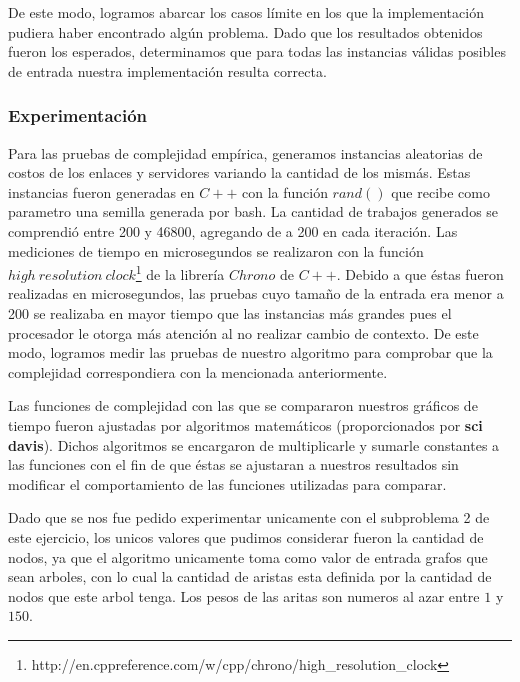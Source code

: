 De este modo, logramos abarcar los casos límite en los que la implementación pudiera haber encontrado algún problema. Dado que los resultados obtenidos fueron los esperados, determinamos que para todas las instancias válidas posibles de entrada nuestra implementación resulta correcta.

\subsubsection{Experimentación}

Para las pruebas de complejidad empírica, generamos instancias aleatorias de costos de los enlaces y servidores variando la cantidad de los mismás. Estas instancias fueron generadas en $C++$ con la función $rand()$ que recibe como parametro una semilla generada por bash. La cantidad de trabajos generados se comprendió entre 200 y 46800, agregando de a 200 en cada iteración. Las mediciones de tiempo en microsegundos se realizaron con la función $high\ resolution\ clock$\footnote{http://en.cppreference.com/w/cpp/chrono/high\_resolution\_clock} de la librería $Chrono$ de $C++$. Debido a que éstas fueron realizadas en microsegundos, las pruebas cuyo tamaño de la entrada era menor a 200 se realizaba en mayor tiempo que las instancias más grandes pues el procesador le otorga más atención al no realizar cambio de contexto. De este modo, logramos medir las pruebas de nuestro algoritmo para comprobar que la complejidad correspondiera con la mencionada anteriormente.

Las funciones de complejidad con las que se compararon nuestros gráficos de tiempo fueron ajustadas por algoritmos matemáticos (proporcionados por \textbf{sci davis}). Dichos algoritmos se encargaron de multiplicarle y sumarle constantes a las funciones con el fin de que éstas se ajustaran a nuestros resultados sin modificar el comportamiento de las funciones utilizadas para comparar.


Dado que se nos fue pedido experimentar unicamente con el subproblema 2 de este ejercicio, los unicos valores que pudimos considerar fueron la cantidad de nodos, ya que el algoritmo unicamente toma como valor de entrada grafos que sean arboles, con lo cual la cantidad de aristas esta definida por la cantidad de nodos que este arbol tenga. Los pesos de las aritas son numeros al azar entre $1$ y $150$.

